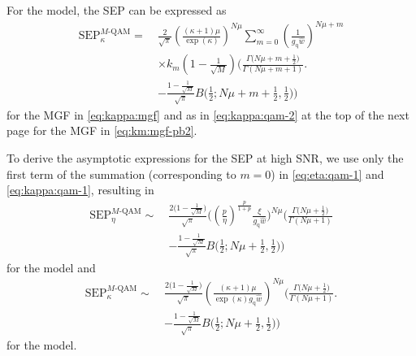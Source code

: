 \documentclass[journal,twocolumn]{IEEEtran}
\begin{document}
For the \km{} model, the \ac{SEP} can be expressed as
\setcounter{equation}{60}
\begin{align}
    \textrm{SEP}^{M\textrm{-QAM}}_{\kappa} = \ & \frac{2}{\sqrt{\pi}}\left(\frac{(\kappa +1) \mu }{\exp(\kappa) }\right)^{N \mu } \sum_{m=0}^{\infty} \left(\frac{1}{g_{\textrm{q}}\hat{w}}\right)^{N\mu+m} \nonumber \\ 
    & \times k_{m} \left(1-\frac{1}{\sqrt{M}}\right)\Bigg(\frac{ \Gamma \big(N \mu + m +\frac{1}{2}\big)}{\Gamma (N \mu + m +1)} \Bigg. \nonumber \\
    & - \frac{1-\frac{1}{\sqrt{M}}}{\sqrt{\pi} } B\bigg(\frac{1}{2};N \mu + m+\frac{1}{2},\frac{1}{2}\bigg)\Bigg) \label{eq:kappa:qam-1}
\end{align}
for the \ac{MGF} in \eqref{eq:kappa:mgf} and as in \eqref{eq:kappa:qam-2} at the top of the next page for the \ac{MGF} in \eqref{eq:km:mgf-pb2}.

To derive the asymptotic expressions for the \ac{SEP} at high \ac{SNR}, we use only the first term of the summation (corresponding to $m=0$) in \eqref{eq:eta:qam-1} and \eqref{eq:kappa:qam-1}, resulting in
\setcounter{equation}{62}
\begin{align}
    \textrm{SEP}^{M\textrm{-QAM}}_{\eta} \sim \ & \frac{2 \big(1-\frac{1}{\sqrt{M}}\big)}{\sqrt{\pi}}\bigg( \left(\frac{p}{\eta }\right)^{\frac{  p}{1+p}} \frac{\xi}{g_{\textrm{q}}\hat{w}} \bigg)^{N\mu} \Bigg( \frac{ \Gamma \big(N \mu +\frac{1}{2}\big)}{\Gamma (N \mu +1)} \nonumber \\
    & - \frac{1-\frac{1}{\sqrt{M}}}{\sqrt{\pi} } B\bigg(\frac{1}{2};N \mu + \frac{1}{2},\frac{1}{2}\bigg)\Bigg) \label{eq:eta:qam-asymp}
\end{align}
for the \Ehm{} model and
\begin{align}
    \textrm{SEP}^{M\textrm{-QAM}}_{\kappa} \sim \ & \frac{2 \big(1-\frac{1}{\sqrt{M}}\big)}{\sqrt{\pi}}\left(\frac{(\kappa +1) \mu }{\exp(\kappa) g_{\textrm{q}}\hat{w} }\right)^{N \mu } \Bigg(\frac{ \Gamma \big(N \mu +\frac{1}{2}\big)}{\Gamma (N \mu +1)} \Bigg. \nonumber \\
    & - \frac{1-\frac{1}{\sqrt{M}}}{\sqrt{\pi} } B\bigg(\frac{1}{2};N \mu +\frac{1}{2},\frac{1}{2}\bigg)\Bigg) \label{eq:kappa:qam-asymp}
\end{align}
for the \km{} model.
\end{document}
